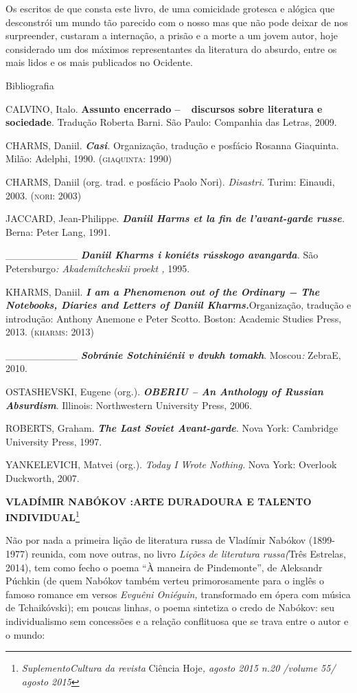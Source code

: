 Os escritos de que consta este livro, de uma comicidade grotesca e
alógica que desconstrói um mundo tão parecido com o nosso mas que não
pode deixar de nos surpreender, custaram a internação, a prisão e a
morte a um jovem autor, hoje considerado um dos máximos representantes
da literatura do absurdo, entre os mais lidos e os mais publicados no
Ocidente.

Bibliografia

CALVINO, Italo. \textbf{Assunto encerrado --~~discursos sobre literatura
e sociedade}. Tradução Roberta Barni. São Paulo: Companhia das Letras,
2009.

CHARMS, Daniil. \emph{\textbf{Casi}.} Organização, tradução e posfácio
Rosanna Giaquinta. Milão: Adelphi, 1990. (\textsc{giaquinta}: 1990)

CHARMS, Daniil (org. trad. e posfácio Paolo Nori). \emph{Disastri.}
Turim: Einaudi, 2003. (\textsc{nori}: 2003)

JACCARD, Jean-Philippe. \emph{\textbf{Daniil Harms et la fin de
l'avant-garde russe}.} Berna: Peter Lang, 1991.~

\_\_\_\_\_\_\_\_\_\_ \emph{\textbf{Daniil Kharms i koniéts rússkogo
avangarda}.} São Petersburgo\emph{: Akademítcheskii proekt ,} 1995.

KHARMS, Daniil. \emph{\textbf{I am a Phenomenon out of the Ordinary −
The Notebooks, Diaries and Letters of Daniil Kharms.}}Organização,
tradução e introdução: Anthony Anemone e Peter Scotto. Boston: Academic
Studies Press, 2013. (\textsc{kharms}: 2013)

\_\_\_\_\_\_\_\_\_\_ \emph{\textbf{Sobránie Sotchiniénii v dvukh
tomakh}}. Moscou\emph{:} ZebraE, 2010.

OSTASHEVSKI, Eugene (org.). \emph{\textbf{OBERIU -- An Anthology of
Russian Absurdism}}. Illinois: Northwestern University Press, 2006.

ROBERTS, Graham. \emph{\textbf{The Last Soviet Avant-garde}.} Nova York:
Cambridge University Press, 1997.

YANKELEVICH, Matvei (org.). \emph{Today I Wrote Nothing.} Nova York:
Overlook Duckworth, 2007.

\protect\hypertarget{__DdeLink__16913_1485881000}{}{}\textbf{VLADÍMIR
NABÓKOV :ARTE DURADOURA E TALENTO INDIVIDUAL}\footnote{\emph{S}\protect\hypertarget{__DdeLink__16916_1485881000}{}{}\emph{uplementoCultura
  da revista} Ciência Hoje\emph{, agosto 2015 n.20 /volume 55/ agosto
  2015}}

\protect\hypertarget{__DdeLink__16919_1485881000}{}{\protect\hypertarget{__DdeLink__16911_1485881000}{}{}}Não
por nada a primeira lição de literatura russa de Vladímir Nabókov
(1899-1977) reunida, com nove outras, no livro \emph{Lições de
literatura russa\emph{(}}Três Estrelas, 2014), tem como fecho o poema
``À maneira de Pindemonte'', de Aleksandr Púchkin (de quem Nabókov
também verteu primorosamente para o inglês o famoso romance em versos
\emph{Evguêni Oniéguin,} transformado em ópera com música de
Tchaikóvski); em poucas linhas, o poema sintetiza o credo de Nabókov:
seu individualismo sem concessões e a relação conflituosa que se trava
entre o autor e o mundo:

